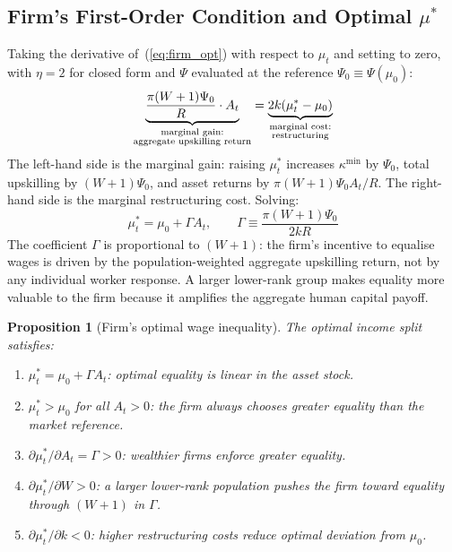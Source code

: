 \documentclass[12pt,a4paper]{article}
\newtheorem{proposition}{Proposition}
\begin{document}
\subsection{Firm's First-Order Condition and Optimal $\mu^*$}

Taking the derivative of~(\ref{eq:firm_opt}) with respect to $\mu_t$
and setting to zero, with $\eta = 2$ for closed form and $\Psi$
evaluated at the reference $\Psi_0 \equiv \Psi(\mu_0)$:
\begin{equation}
  \underbrace{\frac{\pi(W+1)\Psi_0}{R} \cdot A_t}_{%
    \substack{\text{marginal gain:} \\ \text{aggregate upskilling return}}}
  =
  \underbrace{2k(\mu_t^* - \mu_0)}_{%
    \substack{\text{marginal cost:} \\ \text{restructuring}}}
  \label{eq:foc}
\end{equation}
The left-hand side is the marginal gain: raising $\mu_t^*$ increases
$\kappa^{\min}$ by $\Psi_0$, total upskilling by $(W+1)\Psi_0$, and
asset returns by $\pi(W+1)\Psi_0 A_t/R$. The right-hand side is the
marginal restructuring cost. Solving:
\begin{equation}
  \boxed{\mu_t^* = \mu_0 + \Gamma A_t,
  \qquad
  \Gamma \equiv \frac{\pi(W+1)\Psi_0}{2kR}}
  \label{eq:mu_opt}
\end{equation}
The coefficient $\Gamma$ is proportional to $(W+1)$: the firm's
incentive to equalise wages is driven by the population-weighted
aggregate upskilling return, not by any individual worker response.
A larger lower-rank group makes equality more valuable to the firm
because it amplifies the aggregate human capital payoff.

\begin{proposition}[Firm's optimal wage inequality]
\label{prop:firm_mu}
The optimal income split satisfies:
\begin{enumerate}
  \item $\mu_t^* = \mu_0 + \Gamma A_t$: optimal equality is linear in
        the asset stock.
  \item $\mu_t^* > \mu_0$ for all $A_t > 0$: the firm always chooses
        greater equality than the market reference.
  \item $\partial\mu_t^*/\partial A_t = \Gamma > 0$: wealthier firms
        enforce greater equality.
  \item $\partial\mu_t^*/\partial W > 0$: a larger lower-rank population
        pushes the firm toward equality through $(W+1)$ in $\Gamma$.
  \item $\partial\mu_t^*/\partial k < 0$: higher restructuring costs
        reduce optimal deviation from $\mu_0$.
\end{enumerate}
\end{proposition}
\end{document}
